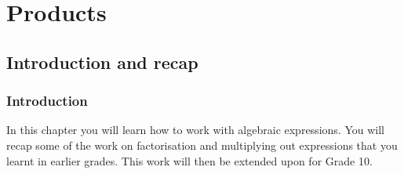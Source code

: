          \section{Products}
    \setcounter{figure}{1}
    \setcounter{subfigure}{1}
    \label{d4e6ddcad4e2d9e383c4732da6858c66}
         \subsection{ Introduction and recap}
    \nopagebreak
    \label{m39383*cid2}
            \subsubsection{ Introduction}
            \nopagebreak
      \label{m39383*id266780}In this chapter you will learn how to work with algebraic expressions. You will recap some of the work on factorisation and multiplying out expressions that you learnt in earlier grades. This work will then be extended upon for Grade 10.\par 
    \label{m39383*cid3}
